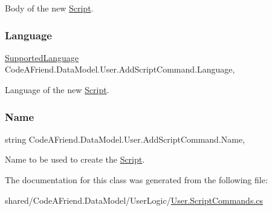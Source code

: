 Body of the new \mbox{\hyperlink{class_code_a_friend_1_1_data_model_1_1_script}{Script}}.

\mbox{\label{class_code_a_friend_1_1_data_model_1_1_user_1_1_add_script_command_a9abdf5a97813615f8a7114de59ef1f40}} 
\subsubsection{\texorpdfstring{Language}{Language}}
{\footnotesize\ttfamily \mbox{\hyperlink{namespace_code_a_friend_1_1_data_model_a13e088c525db1b03a4de75420ced79b2}{Supported\+Language}} Code\+A\+Friend.\+Data\+Model.\+User.\+Add\+Script\+Command.\+Language\hspace{0.3cm}{\ttfamily [get]}, {\ttfamily [set]}}



Language of the new \mbox{\hyperlink{class_code_a_friend_1_1_data_model_1_1_script}{Script}}.

\mbox{\label{class_code_a_friend_1_1_data_model_1_1_user_1_1_add_script_command_a1863594cfd17327344a9b5d11f6ab2de}} 
\subsubsection{\texorpdfstring{Name}{Name}}
{\footnotesize\ttfamily string Code\+A\+Friend.\+Data\+Model.\+User.\+Add\+Script\+Command.\+Name\hspace{0.3cm}{\ttfamily [get]}, {\ttfamily [set]}}



Name to be used to create the \mbox{\hyperlink{class_code_a_friend_1_1_data_model_1_1_script}{Script}}.



The documentation for this class was generated from the following file\+:\begin{DoxyCompactItemize}
\item 
shared/\+Code\+A\+Friend.\+Data\+Model/\+User\+Logic/\mbox{\hyperlink{_user_8_script_commands_8cs}{User.\+Script\+Commands.\+cs}}\end{DoxyCompactItemize}
